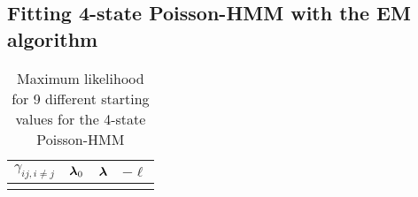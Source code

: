 \subsection{Fitting 4-state Poisson-HMM with the EM algorithm}
\label{app:4-state-em-results}

\begin{table}[ht]
    \centering
    \begin{tabular}{cccc}
        $\gamma_{ij, i\neq j}$ & $\boldsymbol{\lambda}_0$ & $\boldsymbol{\lambda}$ & $-\ell$ \\\hline
        }
    \end{tabular}
    \caption{Maximum likelihood for 9 different starting values for the 4-state Poisson-HMM}
    \label{tbl:4-state-fits-em}
\end{table}

\FloatBarrier
\pagebreak

\nocite{zucchini09}
\nocite{cappe05}




